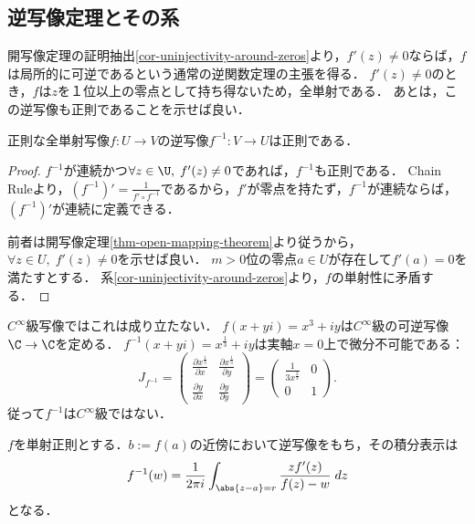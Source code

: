\documentclass[uplatex, dvipdfmx]{jsreport}
\begin{document}
\subsection{逆写像定理とその系}

\begin{tcolorbox}[colframe=ForestGreen, colback=ForestGreen!10!white,breakable,colbacktitle=ForestGreen!40!white,coltitle=black,fonttitle=\bfseries\sffamily,
title=]
    開写像定理の証明抽出\ref{cor-uninjectivity-around-zeros}より，$f'(z)\ne 0$ならば，$f$は局所的に可逆であるという通常の逆関数定理の主張を得る．
    $f'(z)\ne 0$のとき，$f$は$z$を１位以上の零点として持ち得ないため，全単射である．
    あとは，この逆写像も正則であることを示せば良い．
\end{tcolorbox}

\begin{theorem}\label{thm-inverse-mapping-theorem}
    正則な全単射写像$f:U\to V$の逆写像$f^{-1}:V\to U$は正則である．
\end{theorem}
\begin{proof}
    $f^{-1}$が連続かつ$\forall z\in \U,\;f'(z)\ne 0$であれば，$f^{-1}$も正則である．
    Chain Ruleより，$(f^{-1})'=\frac{1}{f'\circ f^{-1}}$であるから，$f'$が零点を持たず，$f^{-1}$が連続ならば，$(f^{-1})'$が連続に定義できる．

    前者は開写像定理\ref{thm-open-mapping-theorem}より従うから，$\forall z\in U,\; f'(z)\ne 0$を示せば良い．
    $m>0$位の零点$a\in U$が存在して$f'(a)=0$を満たすとする．
    系\ref{cor-uninjectivity-around-zeros}より，$f$の単射性に矛盾する．
\end{proof}

\begin{remark}
    $C^\infty$級写像ではこれは成り立たない．
    $f(x+yi)=x^3+iy$は$C^\infty$級の可逆写像$\C\to\C$を定める．
    $f^{-1}(x+yi)=x^{\frac{1}{3}}+iy$は実軸$x=0$上で微分不可能である：
    \[J_{f^{-1}}=\begin{pmatrix}\frac{\partial x^{\frac{1}{3}}}{\partial x}&\frac{\partial x^{\frac{1}{3}}}{\partial y}\\\frac{\partial y}{\partial x}&\frac{\partial y}{\partial y}\end{pmatrix}=\begin{pmatrix}\frac{1}{3x^{\frac{2}{3}}}&0\\0&1\end{pmatrix}.\]
    従って$f^{-1}$は$C^\infty$級ではない．
\end{remark}

\begin{corollary}
    $f$を単射正則とする．$b:=f(a)$の近傍において逆写像をもち，その積分表示は
    \[f^{-1}(w)=\frac{1}{2\pi i}\int_{\abs{z-a}=r}\frac{zf'(z)}{f(z)-w}\;dz\]
    となる．
\end{corollary}
\end{document}
